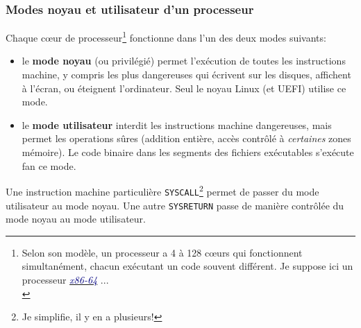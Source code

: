 \documentclass[lualatex,11pt,a4paper,svgnames,french]{beamer}
\begin{document}
\begin{frame}\frametitle{Modes noyau et utilisateur d'un processeur}


  \begin{relsize}{-0.6}
  Chaque c{\oe}ur de processeur\footnote{Selon son modèle,
  un processeur a 4 à 128 c{\oe}urs qui fonctionnent simultanément,
  chacun exécutant un code souvent différent. Je suppose ici un processeur
  \href{https://fr.wikipedia.org/wiki/X64}{\textcolor{Navy}{\textit{x86-64}}} ...\\} fonctionne dans l'un des deux modes suivants:
  \begin{itemize}
    \item le \textbf{mode noyau} (ou privilégié) permet l'exécution de
      toutes les instructions machine, y compris les plus dangereuses
      qui écrivent sur les disques, affichent à l'écran, ou éteignent
      l'ordinateur. Seul le noyau Linux (et UEFI) utilise ce mode.

      \item le \textbf{mode utilisateur} interdit les instructions machine
        dangereuses, mais permet les operations sûres (addition
        entière, accès contrôlé à \textit{certaines} zones
        mémoire). Le code binaire dans les segments des fichiers
        exécutables s'exécute fan ce mode.
  \end{itemize}
  
  Une instruction machine particulière \texttt{SYSCALL}\footnote{Je
  simplifie, il y en a plusieurs!} permet de passer du mode utilisateur
  au mode noyau. Une autre \texttt{SYSRETURN} passe de manière
  contrôlée du mode noyau au mode utilisateur.
  \end{relsize}
\end{frame}
\end{document}
